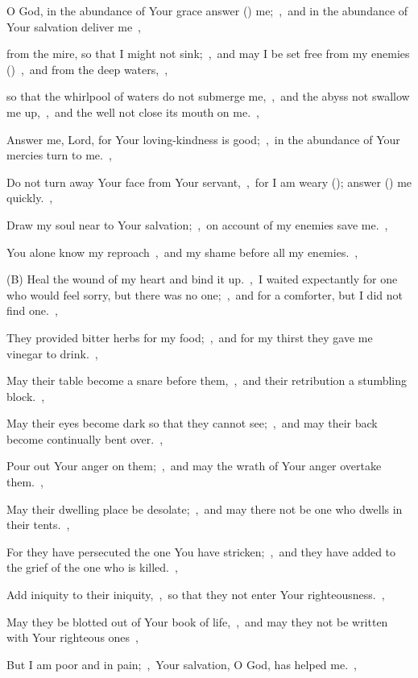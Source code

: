 \documentclass[12pt,twoside,a5paper]{article}
\begin{document}
\begin{normalparskip}
  O God, in the abundance of Your grace answer () me;~\sep\ and in the abundance of Your salvation deliver me~\sep

  from the mire, so that I might not sink;~\sep\ and may I be set free from my enemies ()~\sep\ and from the deep waters,~\sep

  so that the whirlpool of waters do not submerge me,~\sep\ and the abyss not swallow me up,~\sep\ and the well not close its mouth on me.~\sep

  Answer me, Lord, for Your loving-kindness is good;~\sep\ in the abundance of Your mercies turn to me.~\sep

  Do not turn away Your face from Your servant,~\sep\ for I am weary (); answer () me quickly.~\sep

  Draw my soul near to Your salvation;~\sep\ on account of my enemies save me.~\sep

  You alone know my reproach~\sep\ and my shame before all my enemies.~\sep

  (B) Heal the wound of my heart and bind it up.~\sep\ I waited expectantly for one who would feel sorry, but there was no one;~\sep\ and for a comforter, but I did not find one.~\sep

  They provided bitter herbs for my food;~\sep\ and for my thirst they gave me vinegar to drink.~\sep

  May their table become a snare before them,~\sep\ and their retribution a stumbling block.~\sep

  May their eyes become dark so that they cannot see;~\sep\ and may their back become continually bent over.~\sep

  Pour out Your anger on them;~\sep\ and may the wrath of Your anger overtake them.~\sep

  May their dwelling place be desolate;~\sep\ and may there not be one who dwells in their tents.~\sep

  For they have persecuted the one You have stricken;~\sep\ and they have added to the grief of the one who is killed.~\sep

  Add iniquity to their iniquity,~\sep\ so that they not enter Your righteousness.~\sep

  May they be blotted out of Your book of life,~\sep\ and may they not be written with Your righteous ones~\sep

  But I am poor and in pain;~\sep\ Your salvation, O God, has helped me.~\sep


\end{normalparskip}
\end{document}
